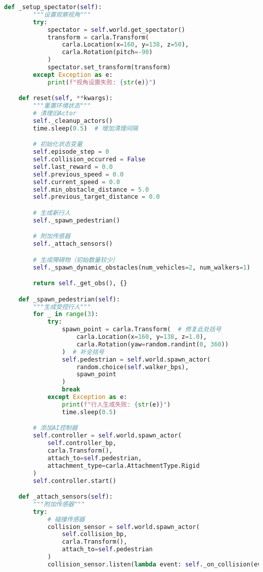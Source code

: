 \begin{lstlisting}[language=Python]
    def _setup_spectator(self):
        """设置观察视角"""
        try:
            spectator = self.world.get_spectator()
            transform = carla.Transform(
                carla.Location(x=160, y=138, z=50),
                carla.Rotation(pitch=-90)
            )
            spectator.set_transform(transform)
        except Exception as e:
            print(f"视角设置失败: {str(e)}")

    def reset(self, **kwargs):
        """重置环境状态"""
        # 清理旧Actor
        self._cleanup_actors()
        time.sleep(0.5)  # 增加清理间隔

        # 初始化状态变量
        self.episode_step = 0
        self.collision_occurred = False
        self.last_reward = 0.0
        self.previous_speed = 0.0
        self.current_speed = 0.0
        self.min_obstacle_distance = 5.0
        self.previous_target_distance = 0.0

        # 生成新行人
        self._spawn_pedestrian()

        # 附加传感器
        self._attach_sensors()

        # 生成障碍物（初始数量较少）
        self._spawn_dynamic_obstacles(num_vehicles=2, num_walkers=1)

        return self._get_obs(), {}

    def _spawn_pedestrian(self):
        """生成受控行人"""
        for _ in range(3):
            try:
                spawn_point = carla.Transform(  # 修复此处括号
                    carla.Location(x=160, y=138, z=1.0),
                    carla.Rotation(yaw=random.randint(0, 360))
                )  # 补全括号
                self.pedestrian = self.world.spawn_actor(
                    random.choice(self.walker_bps),
                    spawn_point
                )
                break
            except Exception as e:
                print(f"行人生成失败: {str(e)}")
                time.sleep(0.5)

        # 添加AI控制器
        self.controller = self.world.spawn_actor(
            self.controller_bp,
            carla.Transform(),
            attach_to=self.pedestrian,
            attachment_type=carla.AttachmentType.Rigid
        )
        self.controller.start()

    def _attach_sensors(self):
        """附加传感器"""
        try:
            # 碰撞传感器
            collision_sensor = self.world.spawn_actor(
                self.collision_bp,
                carla.Transform(),
                attach_to=self.pedestrian
            )
            collision_sensor.listen(lambda event: self._on_collision(event))


\end{lstlisting}
